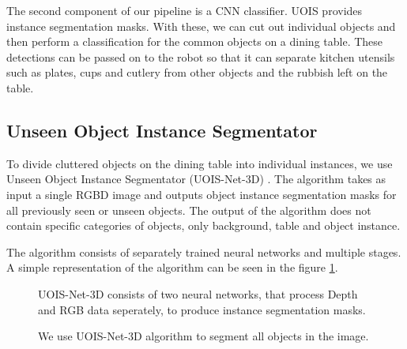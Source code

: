 \documentclass[10pt,twocolumn,letterpaper]{article}
\begin{document}
The second component of our pipeline is a CNN classifier. UOIS provides instance segmentation masks. With these, we can cut out individual objects and then perform a classification for the common objects on a dining table. These detections can be passed on to the robot so that it can separate kitchen utensils such as plates, cups and cutlery from other objects and the rubbish left on the table.



\subsection{Unseen Object Instance Segmentator}

To divide cluttered objects on the dining table into individual instances, we use Unseen Object Instance Segmentator (UOIS-Net-3D) \cite{Xie_Xiang_Mousavian_Fox_2021}. The algorithm takes as input a single RGBD image and outputs object instance segmentation masks for all previously seen or unseen objects. The output of the algorithm does not contain specific categories of objects, only background, table and object instance.

The algorithm consists of separately trained neural networks and multiple stages. A simple representation of the algorithm can be seen in the figure \ref{fig:UOIS-scheme}.

\begin{figure}
\begin{center}
\end{center}
   \caption{UOIS-Net-3D consists of two neural networks, that process Depth and RGB data seperately, to produce instance segmentation masks.}
\label{fig:UOIS-scheme}
\end{figure}

\begin{figure}
\begin{center}
\end{center}
   \caption{We use UOIS-Net-3D algorithm to segment all objects in the image.}
\label{fig:UOIS-example}
\end{figure}
\end{document}

